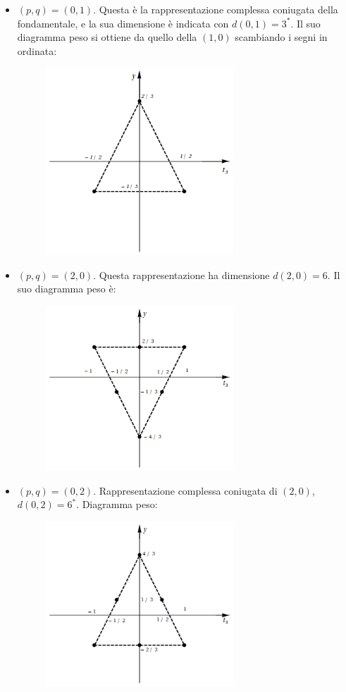 \documentclass[12pt,a4paper]{article}
\theoremstyle{definition}
\numberwithin{equation}{section}
\begin{document}
\begin{itemize}
\item $(p,q)=(0,1)$. Questa è la rappresentazione complessa coniugata della fondamentale, e la sua dimensione è indicata con $d(0,1)=3^*$. Il suo diagramma peso si ottiene da quello della $(1,0)$ scambiando i segni in ordinata:
\begin{figure}[h]
\centering
\includegraphics[width=200pt,keepaspectratio=true]{Addons/01}
\end{figure}

\item $(p,q)=(2,0)$. Questa rappresentazione ha dimensione $d(2,0)=6$. Il suo diagramma peso è:
\begin{figure}[h]
\centering
\includegraphics[width=200pt,keepaspectratio=true]{Addons/20}

\end{figure}
\pagebreak
\item $(p,q)=(0,2)$. Rappresentazione complessa coniugata di $(2,0)$, $d(0,2)=6^*$. Diagramma peso:
\begin{figure}[h]
\centering
\includegraphics[width=200pt,keepaspectratio=true]{Addons/02}


\end{figure}
\end{itemize}
\end{document}
